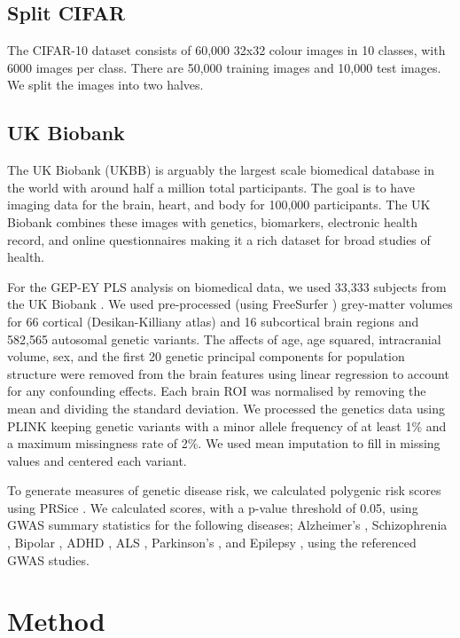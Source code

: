 \subsection{Split CIFAR}
The CIFAR-10 dataset \cite{krizhevsky2009learning} consists of 60,000 32x32 colour images in 10 classes, with 6000 images per class. There are 50,000 training images and 10,000 test images. We split the images into two halves.

\subsection{UK Biobank}
The UK Biobank (UKBB) is arguably the largest scale biomedical database in the world with around half a million total participants. The goal is to have imaging data for the brain, heart, and body for 100,000 participants. The UK Biobank combines these images with genetics, biomarkers, electronic health record, and online questionnaires making it a rich dataset for broad studies of health.

For the GEP-EY PLS analysis on biomedical data, we used 33,333 subjects from the UK Biobank \cite{sudlow2015uk}. We used pre-processed (using FreeSurfer \cite{Fischl2012}) grey-matter volumes for 66 cortical (Desikan-Killiany atlas) and 16 subcortical brain regions and 582,565 autosomal genetic variants. The affects of age, age squared, intracranial volume, sex, and the first 20 genetic principal components for population structure were removed from the brain features using linear regression to account for any confounding effects. Each brain ROI was normalised by removing the mean and dividing the standard deviation. We processed the genetics data using PLINK \cite{Purcell2007} keeping genetic variants with a minor allele frequency of at least 1\%  and a maximum missingness rate of 2\%. We used mean imputation to fill in missing values and centered each variant. 

To generate measures of genetic disease risk, we calculated polygenic risk scores using PRSice \cite{PRSice2014}. We calculated scores, with a p-value threshold of 0.05, using GWAS summary statistics for the following diseases; Alzheimer's \cite{Lambert2013}, Schizophrenia \cite{Trubetskoy2022}, Bipolar \cite{Mullins2021}, ADHD \cite{Demontis2023}, ALS \cite{Van_Rheenen2021}, Parkinson's \cite{Nalls2019}, and Epilepsy \cite{International_League_Against_Epilepsy_Consortium_on_Complex_Epilepsies2018}, using the referenced GWAS studies.


\section{Method}

